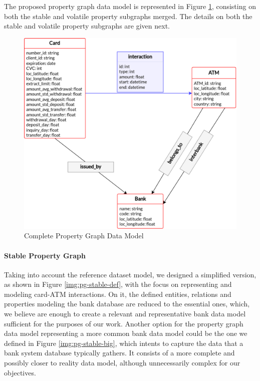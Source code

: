 The proposed property graph data model is represented in Figure \ref{img:pg-complete}, consisting on both the stable and volatile property subgraphs merged. The details on both the stable and volatile property subgraphs are given next.

\begin{figure}[h]
  \centering
  \includegraphics[scale = 0.7]{images/1-DataModel/PG-behavior-complete.png}
  \caption{Complete Property Graph Data Model}
  \label{img:pg-complete}
\end{figure}

\paragraph*{Stable Property Graph\\}\label{section:stable-pg}

Taking into account the reference dataset model, we designed a simplified version, as shown in Figure \ref{img:pg-stable-def}, with the focus on representing and modeling card-ATM interactions. On it, the defined entities, relations and properties modeling the bank database are reduced to the essential ones, which, we believe are enough to create a relevant and representative bank data model sufficient for the purposes of our work. Another option for the property graph data model representing a more common bank data model could be the one we defined in Figure \ref{img:pg-stable-big}, which intents to capture the data that a bank system database typically gathers. It consists of a more complete and possibly closer to reality data model, although unnecessarily complex for our objectives. 

